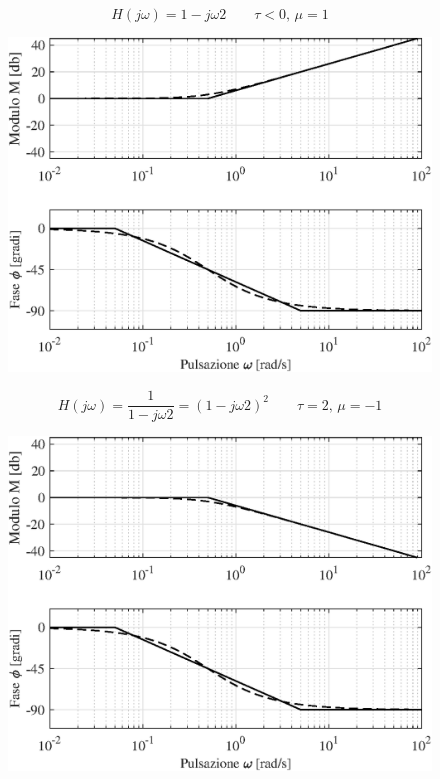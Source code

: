 \begin{nexample}
	\[ H(j\omega) = 1-j\omega2 \qquad\tau<0, \, \mu = 1 \]
\begin{figure}[H]
	\centering
	\includegraphics[width=0.7\linewidth]{immagini/cap6_Bode/es3.eps}
	\label{fig:Bode_es3}
\end{figure}	
\end{nexample}

\begin{nexample}
	\[ H(j\omega) = \frac{1}{1-j\omega2} = (1-j\omega2)^2 \qquad\tau = 2, \, \mu = -1 \]
\begin{figure}[H]
	\centering
	\includegraphics[width=0.7\linewidth]{immagini/cap6_Bode/es4.eps}
	\label{fig:Bode_es4}
\end{figure}	
\end{nexample}

